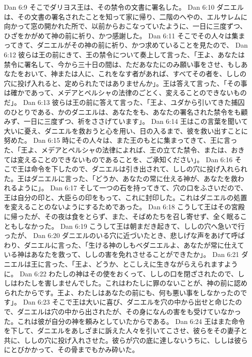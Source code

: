 Dan 6:9  そこでダリヨス王は、その禁令の文書に署名した。
Dan 6:10  ダニエルは、その文書の署名されたことを知って家に帰り、二階のへやの、エルサレムに向かって窓の開かれた所で、以前からおこなっていたように、一日に三度ずつ、ひざをかがめて神の前に祈り、かつ感謝した。
Dan 6:11  そこでその人々は集まってきて、ダニエルがその神の前に祈り、かつ求めていることを見たので、
Dan 6:12  彼らは王の前にきて、王の禁令について奏上して言った、「王よ、あなたは禁令に署名して、今から三十日の間は、ただあなたにのみ願い事をさせ、もしあなたをおいて、神または人に、これをなす者があれば、すべてその者を、ししの穴に投げ入れると、定められたではありませんか」。王は答えて言った、「その事は確かであって、メデアとペルシャの法律のごとく、変えることのできないものだ」。
Dan 6:13  彼らは王の前に答えて言った、「王よ、ユダから引いてきた捕囚のひとりである、かのダニエルは、あなたをも、あなたの署名された禁令をも顧みず、一日に三度ずつ、祈をささげています」。
Dan 6:14  王はこの言葉を聞いて大いに憂え、ダニエルを救おうと心を用い、日の入るまで、彼を救い出すことに努めた。
Dan 6:15  時にその人々は、また王のもとに集まってきて、王に言った、「王よ、メデアとペルシャの法律によれば、王の立てた禁令、または、おきては変えることのできないものであることを、ご承知ください」。
Dan 6:16  そこで王は命令を下したので、ダニエルは引き出されて、ししの穴に投げ入れられた。王はダニエルに言った、「どうか、あなたの常に仕える神が、あなたを救われるように」。
Dan 6:17  そして一つの石を持ってきて、穴の口をふさいだので、王は自分の印と、大臣らの印をもって、これに封印した。これはダニエルの処置を変えることのないようにするためであった。
Dan 6:18  こうして王はその宮殿に帰ったが、その夜は食をとらず、また、そばめたちを召し寄せず、全く眠ることもしなかった。
Dan 6:19  こうして王は朝まだき起きて、ししの穴へ急いで行ったが、
Dan 6:20  ダニエルのいる穴に近づいたとき、悲しげな声をあげて呼ばわり、ダニエルに言った、「生ける神のしもべダニエルよ、あなたが常に仕えている神はあなたを救って、ししの害を免れさせることができたか」。
Dan 6:21  ダニエルは王に言った、「王よ、どうか、とこしえに生きながらえられますように。
Dan 6:22  わたしの神はその使をおくって、ししの口を閉ざされたので、ししはわたしを害しませんでした。これはわたしに罪のないことが、神の前に認められたからです。王よ、わたしはあなたの前にも、何も悪い事をしなかったのです」。
Dan 6:23  そこで王は大いに喜び、ダニエルを穴の中から出せと命じたので、ダニエルは穴の中から出されたが、その身になんの害をも受けていなかった。これは彼が自分の神を頼みとしていたからである。
Dan 6:24  王はまた命令を下して、ダニエルをあしざまに訴えた人々を引いてこさせ、彼らをその妻子と共に、ししの穴に投げ入れさせた。彼らが穴の底に達しないうちに、ししは彼らにとびかかって、その骨までもかみ砕いた。

